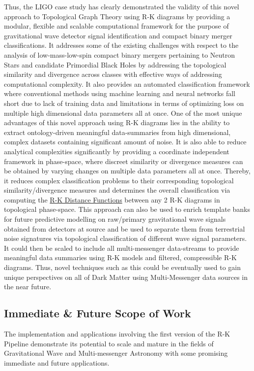 Thus, the LIGO case study has clearly demonstrated the validity of this novel approach to Topological Graph Theory using R-K diagrams by providing a modular, flexible and scalable computational framework for the purpose of gravitational wave detector signal identification and compact binary merger classifications. It addresses some of the existing challenges with respect to the analysis of low-mass-low-spin compact binary mergers pertaining to Neutron Stars and candidate Primordial Black Holes by addressing the topological similarity and divergence across classes with effective ways of addressing computational complexity. It also provides an automated classification framework where conventional methods using machine learning and neural networks fall short due to lack of training data and limitations in terms of optimizing loss on multiple high dimensional data parameters all at once. One of the most unique advantages of this novel approach using R-K diagrams lies in the ability to extract ontology-driven meaningful data-summaries from high dimensional, complex datasets containing significant amount of noise. It is also able to reduce analytical complexities significantly by providing a coordinate independent framework in phase-space, where discreet similarity or divergence measures can be obtained by varying changes on multiple data parameters all at once. Thereby, it reduces complex classification problems to their corresponding topological similarity/divergence measures and determines the overall classification via computing the \hyperref[sec:rk_distance]{R-K Distance Functions} between any 2 R-K diagrams in topological phase-space. This approach can also be used to enrich template banks for future predictive modelling on raw/primary gravitational wave signals obtained from detectors at source and be used to separate them from terrestrial noise signatures via topological classification of different wave signal parameters. It could then be scaled to include all multi-messenger data-streams to provide meaningful data summaries using R-K models and filtered, compressible R-K diagrams. Thus, novel techniques such as this could be eventually used to gain unique perspectives on all of Dark Matter using Multi-Messenger data sources in the near future.

\subsection{Immediate \& Future Scope of Work}

The implementation and applications involving the first version of the R-K Pipeline demonstrate its potential to scale and mature in the fields of Gravitational Wave and Multi-messenger Astronomy with some promising immediate and future applications. 

